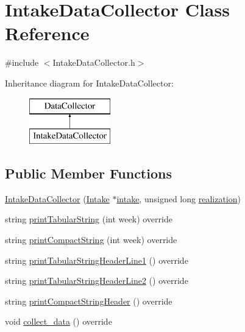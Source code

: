 \hypertarget{classIntakeDataCollector}{}\section{Intake\+Data\+Collector Class Reference}
\label{classIntakeDataCollector}


{\ttfamily \#include $<$Intake\+Data\+Collector.\+h$>$}

Inheritance diagram for Intake\+Data\+Collector\+:\begin{figure}[H]
\begin{center}
\leavevmode
\includegraphics[height=2.000000cm]{classIntakeDataCollector}
\end{center}
\end{figure}
\subsection*{Public Member Functions}
\begin{DoxyCompactItemize}
\item 
\mbox{\hyperlink{classIntakeDataCollector_a2ab4a81bec74a370c60c78609627e807_a2ab4a81bec74a370c60c78609627e807}{Intake\+Data\+Collector}} (\mbox{\hyperlink{classIntake}{Intake}} $\ast$\mbox{\hyperlink{classIntakeDataCollector_a0dfbf640d99394bb82413c9a116db19b_a0dfbf640d99394bb82413c9a116db19b}{intake}}, unsigned long \mbox{\hyperlink{classDataCollector_a9ef2887466fe3123aa19ef956a219b96_a9ef2887466fe3123aa19ef956a219b96}{realization}})
\item 
string \mbox{\hyperlink{classIntakeDataCollector_ada2b88b7a05455cf6f2eebf82d37b3c5_ada2b88b7a05455cf6f2eebf82d37b3c5}{print\+Tabular\+String}} (int week) override
\item 
string \mbox{\hyperlink{classIntakeDataCollector_ac39a40726fd4fe887425b24a10f04034_ac39a40726fd4fe887425b24a10f04034}{print\+Compact\+String}} (int week) override
\item 
string \mbox{\hyperlink{classIntakeDataCollector_ae17ab7e6c75e77f5981f6a682597bb5c_ae17ab7e6c75e77f5981f6a682597bb5c}{print\+Tabular\+String\+Header\+Line1}} () override
\item 
string \mbox{\hyperlink{classIntakeDataCollector_a2855eb8eed71649309bd4d9336f258c0_a2855eb8eed71649309bd4d9336f258c0}{print\+Tabular\+String\+Header\+Line2}} () override
\item 
string \mbox{\hyperlink{classIntakeDataCollector_a42d56dd08e57a7e6e48812a2ab522439_a42d56dd08e57a7e6e48812a2ab522439}{print\+Compact\+String\+Header}} () override
\item 
void \mbox{\hyperlink{classIntakeDataCollector_aed1610e5419465b35041b05b9f60c212_aed1610e5419465b35041b05b9f60c212}{collect\+\_\+data}} () override
\end{DoxyCompactItemize}
